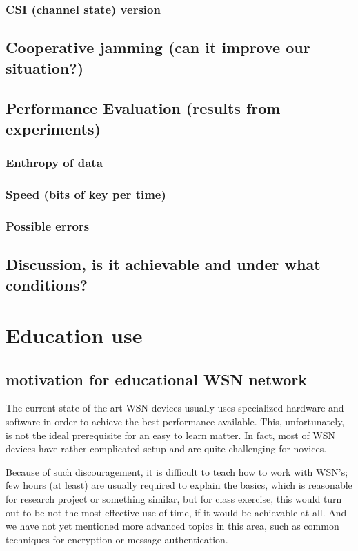 \documentclass[
  digital, %
  table,   %
  nolof,     %
  nolot,     %
           oneside
]{fithesis3}
\begin{document}
    \subsection{CSI (channel state) version}
  \section{Cooperative jamming (can it improve our situation?)}
  \section{Performance Evaluation (results from experiments)}
    \subsection{Enthropy of data}
    \subsection{Speed (bits of key per time)}
    \subsection{Possible errors}
  \section{Discussion, is it achievable and under what conditions?}
\chapter{Education use}

  \section{motivation for educational WSN network}
  The current state of the art WSN devices usually uses specialized hardware
  and software in order to achieve the best performance available. %
  This, unfortunately, is not the ideal prerequisite for an easy to learn matter. In fact, most of WSN devices have rather complicated setup and are
  quite challenging for novices. %

  Because of such discouragement, it is difficult to teach how to
  work with WSN’s; few hours (at least) are usually required
  to explain the basics, which is reasonable for research project or
  something similar, but for class exercise, this would turn out to be
  not the most effective use of time, if it would be achievable at all. And
  we have not yet mentioned more advanced topics in this area, such as
  common techniques for encryption or message authentication.
\end{document}
